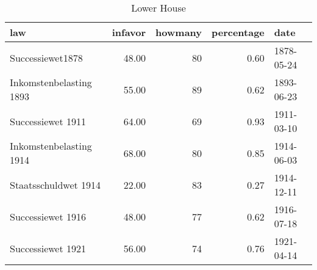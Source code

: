 \begin{table}[ht]
\centering
\begin{tabular}{lrrrl}
  \hline
law & infavor & howmany & percentage & date \\ 
  \hline
Successiewet1878 & 48.00 &  80 & 0.60 & 1878-05-24 \\ 
  Inkomstenbelasting 1893 & 55.00 &  89 & 0.62 & 1893-06-23 \\ 
  Successiewet 1911 & 64.00 &  69 & 0.93 & 1911-03-10 \\ 
  Inkomstenbelasting 1914 & 68.00 &  80 & 0.85 & 1914-06-03 \\ 
  Staatsschuldwet 1914 & 22.00 &  83 & 0.27 & 1914-12-11 \\ 
  Successiewet 1916 & 48.00 &  77 & 0.62 & 1916-07-18 \\ 
  Successiewet 1921 & 56.00 &  74 & 0.76 & 1921-04-14 \\ 
   \hline
\end{tabular}
\caption{Lower House} 
\end{table}
